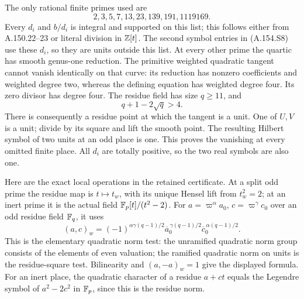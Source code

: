 The only rational finite primes used are
\[
             2,3,5,7,13,23,139,191,1119169.
\tag{A.154.S10}
\]
Every \(d_i\) and \(b/d_i\) is integral and
supported on this list; this follows either
from A.150.22--23 or literal division in
\(\mathbb Z[t]\).  The second symbol entries in
(A.154.S8) use these \(d_i\), so they are units
outside this list.
At every other prime the quartic has smooth
genus-one reduction.  The primitive weighted
quadratic tangent cannot vanish identically
on that curve: its reduction has nonzero
coefficients and weighted degree two, whereas
the defining equation has weighted degree
four.  Its zero divisor has degree four.
The residue field has size \(q\geq11\), and
\[
                   q+1-2\sqrt q>4.
\]
There is consequently a residue point at
which the tangent is a unit.  One of \(U,V\)
is a unit; divide by its square and lift the
smooth point.  The resulting Hilbert symbol
of two units at an odd place is one.
This proves the vanishing at every omitted
finite place.  All \(d_i\) are totally positive,
so the two real symbols are also one.

Here are the exact local operations in the
retained certificate.  At a split odd prime
the residue map is \(t\mapsto t_w\), with its
unique Hensel lift from \(t_w^2=2\); at an inert
prime it is the actual field
\(\mathbb F_p[t]/(t^2-2)\).
For \(a=\varpi^\alpha a_0\), \(c=\varpi^\gamma c_0\)
over an odd residue field \(\mathbb F_q\), it uses
\[
 (a,c)_w=(-1)^{\alpha\gamma(q-1)/2}
              \overline a_0^{\,\gamma(q-1)/2}
              \overline c_0^{\,\alpha(q-1)/2}.
\tag{A.154.S11}
\]
This is the elementary quadratic norm test:
the unramified quadratic norm group consists
of the elements of even valuation; the
ramified quadratic norm on units is the
residue-square test.  Bilinearity and
\((a,-a)_w=1\) give the displayed formula.
For an inert place, the quadratic character
of a residue \(a+ct\) equals the Legendre
symbol of \(a^2-2c^2\) in \(\mathbb F_p\), since
this is the residue norm.

